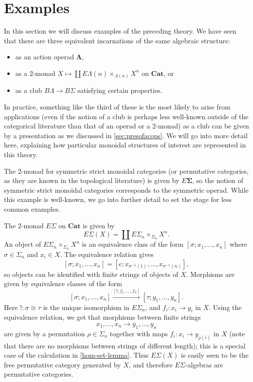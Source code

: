 \documentclass{amsbook} %
\newcommand{\mb}{\mathbf}
\numberwithin{section}{chapter}
\begin{document}
\section{Examples}\label{sec:examples}

In this section we will discuss examples of the preceding theory.  We have seen that there are three equivalent incarnations of the same algebraic structure:
\begin{itemize}
\item as an action operad $\mb{\Lambda}$,
\item as a 2-monad $X \mapsto \coprod E\Lambda(n) \times_{\Lambda(n)} X^{n}$ on $\mb{Cat}$, or
\item as a club $B\Lambda \rightarrow B\Sigma$ satisfying certain properties.
\end{itemize}
In practice, something like the third of these is the most likely to arise from applications (even if the notion of a club is perhaps less well-known outside of the categorical literature than that of an operad or a 2-monad) as a club can be given by a presentation as we discussed in \cref{sec:presofacops}.  We will go into more detail here, explaining how particular monoidal structures of interest are represented in this theory.


\begin{example}
The 2-monad for symmetric strict monoidal categories (or permutative categories, as they are known in the topological literature) is given by $E \mb{\Sigma}$, so the notion of symmetric strict monoidal categories corresponds to the symmetric operad.  While this example is well-known, we go into further detail to set the stage for less common examples.

The 2-monad $E\Sigma$ on $\mb{Cat}$ is given by
\[
E\Sigma (X) = \coprod E\Sigma_{n} \times_{\Sigma_{n}} X^{n}.
\]
An object of $E\Sigma_{n} \times_{\Sigma_{n}} X^{n}$ is an equivalence class of the form $[\sigma; x_{1}, \ldots, x_{n}]$ where $\sigma \in \Sigma_{n}$ and $x_{i} \in X$.  The equivalence relation gives
\[
[\sigma; x_{1}, \ldots, x_{n}] = [e; x_{\sigma^{-1}(1)}, \ldots, x_{\sigma^{-1}(n)}],
\]
so objects can be identified with finite strings of objects of $X$.  Morphisms are given by equivalence classes of the form
\[
[\sigma; x_{1}, \ldots, x_{n}] \stackrel{[!; f_{1}, \ldots, f_{n}]}{\longrightarrow} [\tau; y_{1}, \ldots, y_{n}].
\]
Here $! \colon \sigma \cong \tau$ is the unique isomorphism in $E \Sigma_{n}$, and $f_{i} \colon x_{i} \rightarrow y_{i}$ in $X$.  Using the equivalence relation, we get that morphisms between finite strings
\[
x_{1}, \ldots, x_{n} \rightarrow y_{1}, \ldots, y_{n}
\]
are given by a permutation $\rho \in \Sigma_{n}$ together with maps $f_{i} \colon x_{i} \rightarrow y_{\rho(i)}$ in $X$ (note that there are no morphisms between strings of different length); this is a special case of the calculation in \ref{hom-set-lemma}.  Thus $E \Sigma(X)$ is easily seen to be the free permutative category generated by $X$, and therefore $E \Sigma$-algebras are permutative categories.
\end{example}
\end{document}
